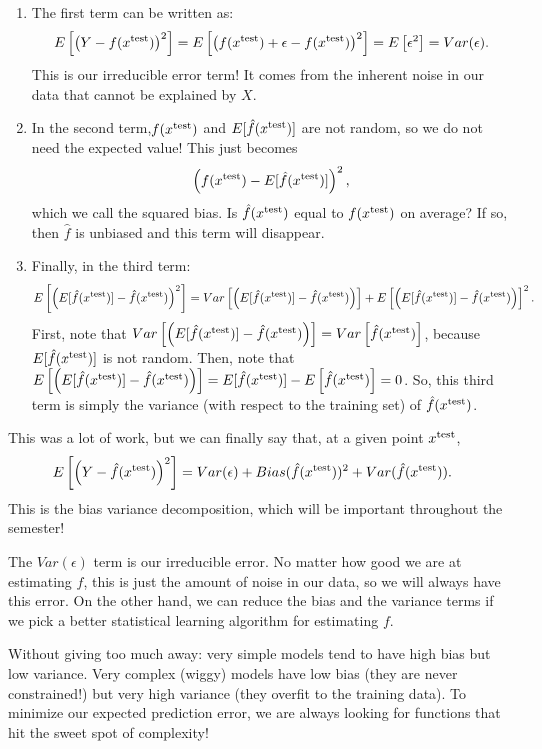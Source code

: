 \begin{enumerate}
\item The first term can be written as:
$$
E\left[\left(Y -f(x^{\mathrm{test}})\right)^2\right] = E\left[\left(f(x^{\mathrm{test}})+\epsilon -f(x^{\mathrm{test}})\right)^2\right] = E\left[\epsilon^2\right] = Var(\epsilon).  
$$
This is our irreducible error term! It comes from the inherent noise in our data that cannot be explained by $X$. 
\item In the second term,$f(x^{\mathrm{test}})$ and $E[\hat{f}(x^{\mathrm{test}})]$ are not random, so we do not need the expected value! This just becomes
$$
\left(f(x^{\mathrm{test}}) - E[\hat{f}(x^{\mathrm{test}})]\right)^2,
$$
which we call the squared bias. Is $\hat{f}(x^{\mathrm{test}})$ equal to $f(x^{\mathrm{test}})$ on average? If so, then $\hat{f}$ is unbiased and this term will disappear. 
\item Finally, in the third term: 
$$
 E\left[\left(E[\hat{f}(x^{\mathrm{test}})] -  \hat{f}(x^{\mathrm{test}})\right)^2\right] =  Var\left[\left(E[\hat{f}(x^{\mathrm{test}})] -  \hat{f}(x^{\mathrm{test}})\right)\right]  + E\left[\left(E[\hat{f}(x^{\mathrm{test}})] -  \hat{f}(x^{\mathrm{test}})\right)\right]^2.
$$
First, note that $Var\left[\left(E[\hat{f}(x^{\mathrm{test}})] -  \hat{f}(x^{\mathrm{test}})\right)\right] = Var\left[\hat{f}(x^{\mathrm{test}})\right]$, because $E[\hat{f}(x^{\mathrm{test}})]$ is not random. Then, note that $E\left[\left(E[\hat{f}(x^{\mathrm{test}})] -  \hat{f}(x^{\mathrm{test}})\right)\right] = E[\hat{f}(x^{\mathrm{test}})] -  E\left[\hat{f}(x^{\mathrm{test}})\right] = 0$. So, this third term is simply the variance (with respect to the training set) of $\hat{f}(x^{\mathrm{test}})$. 
\end{enumerate}

This was a lot of work, but we can finally say that, at a given point $x^{\mathrm{test}}$,  
\begin{align*}
 E\left[\left(Y - \hat{f}(x^{\mathrm{test}})\right)^2 \right] &= Var(\epsilon) + Bias(\hat{f}(x^{\mathrm{test}}))^2 + Var(\hat{f}(x^{\mathrm{test}})). 
\end{align*}
This is the bias variance decomposition, which will be important throughout the semester! 

The $Var(\epsilon)$ term is our irreducible error. No matter how good we are at estimating $f$, this is just the amount of noise in our data, so we will always have this error. On the other hand, we can reduce the bias and the variance terms if we pick a better statistical learning algorithm for estimating $f$. 

Without giving too much away: very simple models tend to have high bias but low variance. Very complex (wiggy) models have low bias (they are never constrained!) but very high variance (they overfit to the training data). To minimize our expected prediction error, we are always looking for functions that hit the sweet spot of complexity! 

